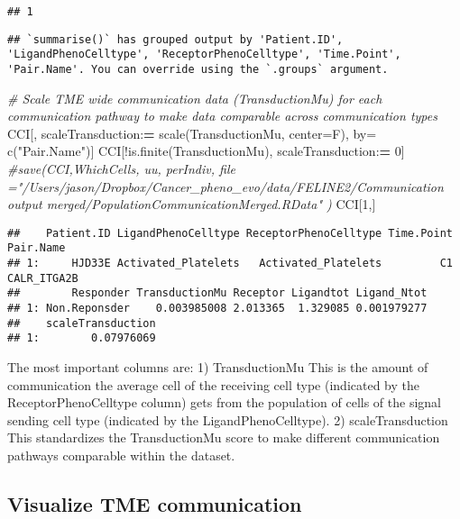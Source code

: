 \documentclass[
]{article}
\newenvironment{Shaded}{\begin{snugshade}}{\end{snugshade}}
\newcommand{\AttributeTok}[1]{\textcolor[rgb]{0.77,0.63,0.00}{#1}}
\newcommand{\CommentTok}[1]{\textcolor[rgb]{0.56,0.35,0.01}{\textit{#1}}}
\newcommand{\DecValTok}[1]{\textcolor[rgb]{0.00,0.00,0.81}{#1}}
\newcommand{\ErrorTok}[1]{\textcolor[rgb]{0.64,0.00,0.00}{\textbf{#1}}}
\newcommand{\FunctionTok}[1]{\textcolor[rgb]{0.00,0.00,0.00}{#1}}
\newcommand{\NormalTok}[1]{#1}
\newcommand{\OtherTok}[1]{\textcolor[rgb]{0.56,0.35,0.01}{#1}}
\newcommand{\SpecialCharTok}[1]{\textcolor[rgb]{0.00,0.00,0.00}{#1}}
\newcommand{\StringTok}[1]{\textcolor[rgb]{0.31,0.60,0.02}{#1}}
\begin{document}
\begin{verbatim}
## 1
\end{verbatim}

\begin{verbatim}
## `summarise()` has grouped output by 'Patient.ID', 'LigandPhenoCelltype', 'ReceptorPhenoCelltype', 'Time.Point', 'Pair.Name'. You can override using the `.groups` argument.
\end{verbatim}

\begin{Shaded}
\begin{Highlighting}[]
\CommentTok{\# Scale TME wide communication data (TransductionMu) for each communication pathway to make data comparable across communication types}
\NormalTok{CCI[, scaleTransduction}\SpecialCharTok{:}\ErrorTok{=} \FunctionTok{scale}\NormalTok{(TransductionMu, }\AttributeTok{center=}\NormalTok{F), by}\OtherTok{=} \FunctionTok{c}\NormalTok{(}\StringTok{"Pair.Name"}\NormalTok{)] }
\NormalTok{CCI[}\SpecialCharTok{!}\FunctionTok{is.finite}\NormalTok{(TransductionMu), scaleTransduction}\SpecialCharTok{:}\ErrorTok{=} \DecValTok{0}\NormalTok{]}
\CommentTok{\#save(CCI,WhichCells, uu, perIndiv, file ="/Users/jason/Dropbox/Cancer\_pheno\_evo/data/FELINE2/Communication output merged/PopulationCommunicationMerged.RData" )}
\NormalTok{CCI[}\DecValTok{1}\NormalTok{,]}
\end{Highlighting}
\end{Shaded}

\begin{verbatim}
##    Patient.ID LigandPhenoCelltype ReceptorPhenoCelltype Time.Point   Pair.Name
## 1:     HJD33E Activated_Platelets   Activated_Platelets         C1 CALR_ITGA2B
##        Responder TransductionMu Receptor Ligandtot Ligand_Ntot
## 1: Non.Reponsder    0.003985008 2.013365  1.329085 0.001979277
##    scaleTransduction
## 1:        0.07976069
\end{verbatim}

The most important columns are: 1) TransductionMu This is the amount of
communication the average cell of the receiving cell type (indicated by
the ReceptorPhenoCelltype column) gets from the population of cells of
the signal sending cell type (indicated by the LigandPhenoCelltype). 2)
scaleTransduction This standardizes the TransductionMu score to make
different communication pathways comparable within the dataset.

\hypertarget{visualize-tme-communication}{%
\subsection{Visualize TME
communication}\label{visualize-tme-communication}}
\end{document}

